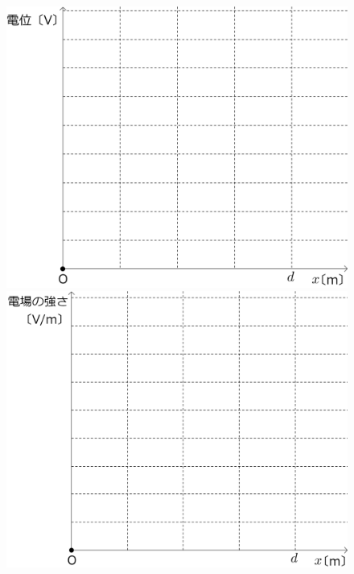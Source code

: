 \begin{figure}[H]
  \centering
  \begin{minipage}{0.4\columnwidth}
    \includegraphics[width=\columnwidth]{../graphs/jumon_108_2.png}
    \caption{}
  \end{minipage}
  \begin{minipage}{0.4\columnwidth}
    \includegraphics[width=\columnwidth]{../graphs/jumon_108_3.png}
    \caption{}
  \end{minipage}
\end{figure}

